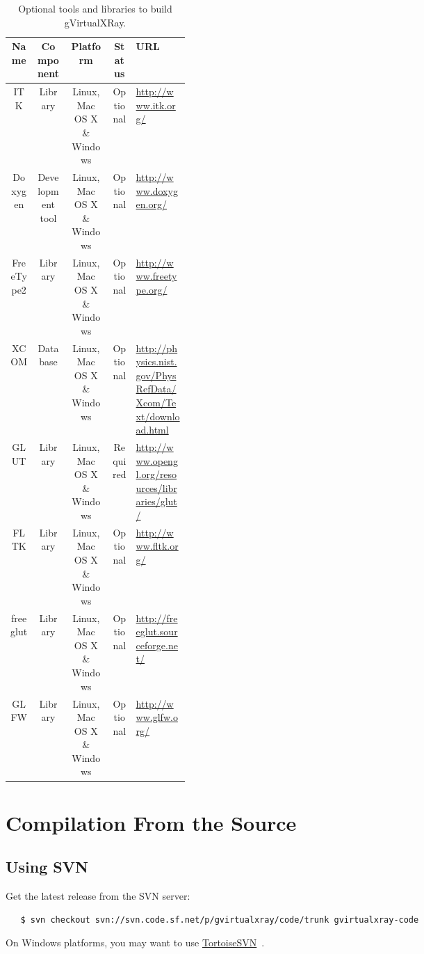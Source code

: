 \documentclass[11pt,oneside,a4paper,final]{article}
\begin{document}
\begin{table}[tbhp]
	\begin{center}
		\caption{\label{tab:optionalToolsAndLibraries} Optional tools and libraries to build gVirtualXRay.} 
		\begin{small}
			\begin{tabular}{|c|c|c|c|p{0.3\linewidth}|}
				\hline
				\textbf{Name} & \textbf{Component} & \textbf{Platform} & \textbf{Status} & \textbf{URL}\\
				\hline
				\hline
				\Acrshort{ITK} & Library & Linux, Mac OS X \& Windows & Optional & \url{http://www.itk.org/}\\
				\hline
				Doxygen & Development tool & Linux, Mac OS X \& Windows & Optional & \url{http://www.doxygen.org/}\\
				\hline
				FreeType2 & Library & Linux, Mac OS X \& Windows & Optional & \url{http://www.freetype.org/}\\
				\hline
				XCOM & Database & Linux, Mac OS X \& Windows & Optional & \url{http://physics.nist.gov/PhysRefData/Xcom/Text/download.html}\\
				\hline
				\Acrshort{GLUT} & Library & Linux, Mac OS X \& Windows & Required & \url{http://www.opengl.org/resources/libraries/glut/}\\
				\hline
				\Acrshort{FLTK} & Library & Linux, Mac OS X \& Windows & Optional & \url{http://www.fltk.org/}\\
				\hline
				freeglut & Library & Linux, Mac OS X \& Windows & Optional & \url{http://freeglut.sourceforge.net/}\\
				\hline
				GLFW & Library & Linux, Mac OS X \& Windows & Optional & \url{http://www.glfw.org/}\\
				\hline
			\end{tabular}
		\end{small}
	\end{center}
\end{table}


\newpage
\section{Compilation From the Source}

\subsection{Using SVN}
Get the latest release from the \Gls{SVN} server:
\begin{verbatim}
   $ svn checkout svn://svn.code.sf.net/p/gvirtualxray/code/trunk gvirtualxray-code
\end{verbatim}
On Windows platforms, you may want to use \href{http://tortoisesvn.tigris.org/}{TortoiseSVN}~\cite{tortoisesvn}.
\end{document}
